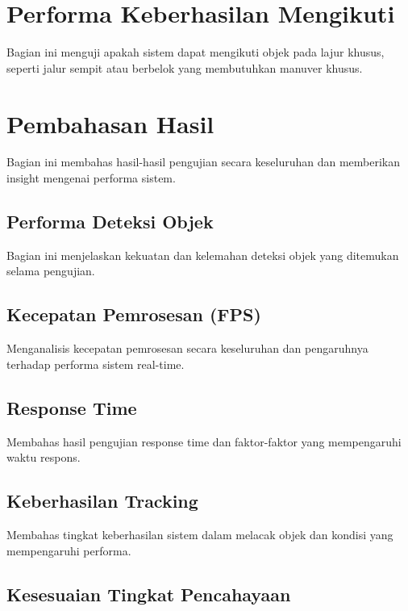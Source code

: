 \section{Performa Keberhasilan Mengikuti}
\label{sec:performamengikuti}

Bagian ini menguji apakah sistem dapat mengikuti objek pada lajur khusus, seperti jalur sempit atau berbelok yang membutuhkan manuver khusus.

\section{Pembahasan Hasil}
\label{sec:pembahasanhasil}

Bagian ini membahas hasil-hasil pengujian secara keseluruhan dan memberikan insight mengenai performa sistem.

\subsection{Performa Deteksi Objek}
\label{sec:performadeteksiobjek}

Bagian ini menjelaskan kekuatan dan kelemahan deteksi objek yang ditemukan selama pengujian.

\subsection{Kecepatan Pemrosesan (FPS)}
\label{sec:kecepatanpemrosesan}

Menganalisis kecepatan pemrosesan secara keseluruhan dan pengaruhnya terhadap performa sistem real-time.

\subsection{Response Time}
\label{sec:responsetime}

Membahas hasil pengujian response time dan faktor-faktor yang mempengaruhi waktu respons.

\subsection{Keberhasilan Tracking}
\label{sec:performatracking}

Membahas tingkat keberhasilan sistem dalam melacak objek dan kondisi yang mempengaruhi performa.

\subsection{Kesesuaian Tingkat Pencahayaan}
\label{sec:kesesuaianpencahayaan}

